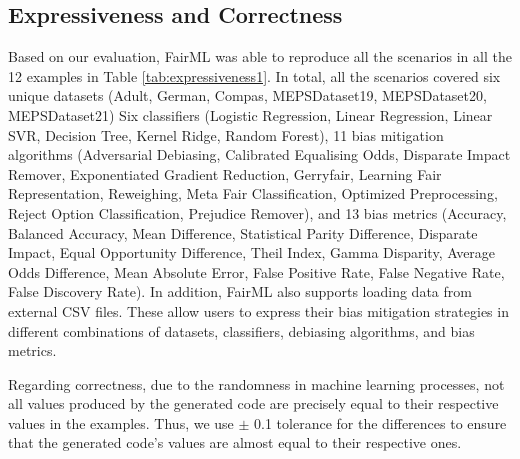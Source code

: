 \documentclass[sigconf,review]{acmart}
\begin{document}
	\subsection{Expressiveness and Correctness}
	\label{sec:expressiveness_and_correctness}
	Based on our evaluation, FairML was able to reproduce all the scenarios in all the 12 examples in Table \ref{tab:expressiveness1}.
	In total, all the scenarios covered six unique datasets 
	(Adult, German, Compas, MEPSDataset19, MEPSDataset20, MEPSDataset21)
	Six classifiers (Logistic Regression, Linear Regression, Linear SVR, Decision Tree, Kernel Ridge, Random Forest), 
	11 bias mitigation algorithms 
	(Adversarial Debiasing, Calibrated Equalising Odds, Disparate Impact Remover, Exponentiated Gradient Reduction, Gerryfair, Learning Fair Representation, Reweighing, Meta Fair Classification, Optimized Preprocessing, Reject Option Classification, Prejudice Remover), 
	and 
	13 bias metrics 
	(Accuracy, Balanced Accuracy, Mean Difference, Statistical Parity Difference, Disparate Impact, Equal Opportunity Difference, Theil Index, Gamma Disparity, Average Odds Difference, Mean Absolute Error, False Positive Rate, False Negative Rate, False Discovery Rate). 
	In addition, FairML also supports loading data from external CSV files. These allow users to express their bias mitigation strategies in different combinations of datasets, classifiers, debiasing algorithms, and bias metrics.
	
	Regarding correctness, due to the randomness in machine learning processes, not all values produced by the generated code are precisely equal to their respective values in the examples. Thus, we use $\pm$ 0.1 tolerance for the differences to ensure that the generated code's values are almost equal to their respective ones.
	
\end{document}
